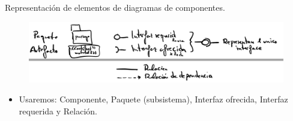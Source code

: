 \documentclass[12pt, twoside, openright]{report} %
\begin{document}
Representación de elementos de diagramas de componentes.
\begin{figure}[H]
	{\includegraphics[scale=.3]{Untitled 34.png}}
\end{figure}
\begin{itemize}
	\item Usaremos: Componente, Paquete (subsistema), Interfaz ofrecida,
	Interfaz requerida y Relación.
\end{itemize}
\end{document}
